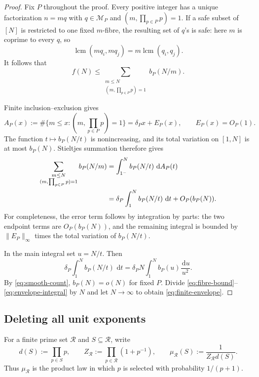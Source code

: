 \documentclass[11pt]{article}
\numberwithin{equation}{section}
\theoremstyle{plain}
\newcommand{\1}{\mathbf 1}
\newcommand{\dd}{\,\mathrm d}
\newcommand{\cM}{\mathcal M}
\newcommand{\cR}{\mathcal R}
\newcommand{\lcm}{\operatorname{lcm}}
\begin{document}
\begin{proof}
Fix $P$ throughout the proof.  Every positive integer has a unique
factorization $n=mq$ with $q\in\cM_P$ and
$(m,\prod_{p\in P}p)=1$.  If a safe subset of $[N]$ is restricted to one
fixed $m$-fibre, the resulting set of $q$'s is safe: here $m$ is coprime to
every $q$, so
\[
 \lcm(mq_i,mq_j)=m\lcm(q_i,q_j).
\]
It follows that
\begin{equation}\label{eq:fibre-bound}
 f(N)\le
 \sum_{\substack{m\le N\\(m,\prod_{p\in P}p)=1}}b_P(N/m).
\end{equation}

Finite inclusion--exclusion gives
\[
 A_P(x):=\#\{m\le x:(m,\textstyle\prod_{p\in P}p)=1\}
 =\delta_Px+E_P(x),
 \qquad E_P(x)=O_P(1).
\]
The function $t\mapsto b_P(N/t)$ is nonincreasing, and its total variation
on $[1,N]$ is at most $b_P(N)$.  Stieltjes summation therefore gives
\begin{align}
 \sum_{\substack{m\le N\\(m,\prod_{p\in P}p)=1}}b_P(N/m)
 &=\int_{1^-}^{N}b_P(N/t)\,\dd A_P(t)\notag\\
 &=\delta_P\int_1^N b_P(N/t)\,\dd t+O_P(b_P(N)).
                                                        \label{eq:stieltjes}
\end{align}
For completeness, the error term follows by integration by parts: the two
endpoint terms are $O_P(b_P(N))$, and the remaining integral is bounded by
$\|E_P\|_\infty$ times the total variation of $b_P(N/t)$.

In the main integral set $u=N/t$.  Then
\begin{equation}\label{eq:envelope-integral}
 \delta_P\int_1^N b_P(N/t)\,\dd t
 =\delta_PN\int_1^N b_P(u)\frac{\dd u}{u^2}.
\end{equation}
By \eqref{eq:smooth-count}, $b_P(N)=o(N)$ for fixed $P$.  Divide
\eqref{eq:fibre-bound}--\eqref{eq:envelope-integral} by $N$ and let
$N\to\infty$ to obtain \eqref{eq:finite-envelope}.
\end{proof}

\subsection{Deleting all unit exponents}

For a finite prime set $\cR$ and $S\subseteq\cR$, write
\[
 d(S):=\prod_{p\in S}p,
 \qquad
 Z_{\cR}:=\prod_{p\in\cR}(1+p^{-1}),
 \qquad
 \mu_{\cR}(S):=\frac1{Z_{\cR}d(S)}.
\]
Thus $\mu_{\cR}$ is the product law in which $p$ is selected with
probability $1/(p+1)$.
\end{document}
